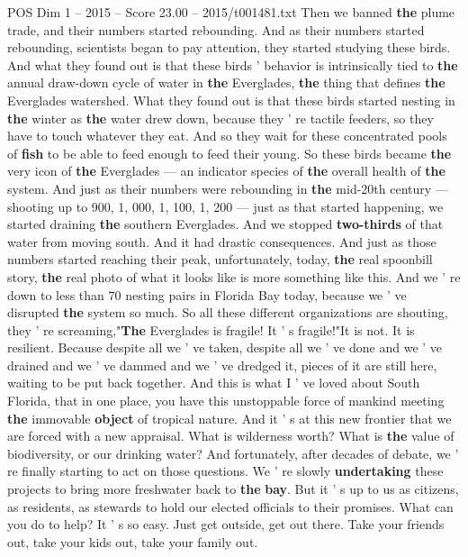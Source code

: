 \begin{textsample}{POS Dim 1 – 2015 – Score 23.00 – 2015/t001481.txt}
Then we banned \textbf{the} plume trade, and their numbers started rebounding.
And as their numbers started rebounding, scientists began to pay attention, they started studying these birds.
And what they found out is that these birds ' behavior is intrinsically tied to \textbf{the} annual draw-down cycle of water in \textbf{the} Everglades, \textbf{the} thing that defines \textbf{the} Everglades watershed.
What they found out is that these birds started nesting in \textbf{the} winter as \textbf{the} water drew down, because they ' re tactile feeders, so they have to touch whatever they eat.
And so they wait for these concentrated pools of \textbf{fish} to be able to feed enough to feed their young.
So these birds became \textbf{the} very icon of \textbf{the} Everglades — an indicator species of \textbf{the} overall health of \textbf{the} system.
And just as their numbers were rebounding in \textbf{the} mid-20th century — shooting up to 900, 1, 000, 1, 100, 1, 200 — just as that started happening, we started draining \textbf{the} southern Everglades.
And we stopped \textbf{two-thirds} of that water from moving south.
And it had drastic consequences.
And just as those numbers started reaching their peak, unfortunately, today, \textbf{the} real spoonbill story, \textbf{the} real photo of what it looks like is more something like this.
And we ' re down to less than 70 nesting pairs in Florida Bay today, because we ' ve disrupted \textbf{the} system so much.
So all these different organizations are shouting, they ' re screaming,"\textbf{The} Everglades is fragile!
It ' s fragile!"It is not.
It is resilient.
Because despite all we ' ve taken, despite all we ' ve done and we ' ve drained and we ' ve dammed and we ' ve dredged it, pieces of it are still here, waiting to be put back together.
And this is what I ' ve loved about South Florida, that in one place, you have this unstoppable force of mankind meeting \textbf{the} immovable \textbf{object} of tropical nature.
And it ' s at this new frontier that we are forced with a new appraisal.
What is wilderness worth?
What is \textbf{the} value of biodiversity, or our drinking water?
And fortunately, after decades of debate, we ' re finally starting to act on those questions.
We ' re slowly \textbf{undertaking} these projects to bring more freshwater back to \textbf{the} \textbf{bay}.
But it ' s up to us as citizens, as residents, as stewards to hold our elected officials to their promises.
What can you do to help?
It ' s so easy.
Just get outside, get out there.
Take your friends out, take your kids out, take your family out.

\end{textsample}

